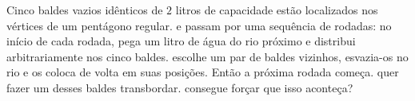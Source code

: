 Cinco baldes vazios idênticos de $2$ litros de capacidade estão localizados nos vértices de um pentágono regular.
 e  passam por uma sequência de rodadas:
no início de cada rodada,  pega um litro de água do rio próximo e distribui arbitrariamente nos cinco baldes.
 escolhe um par de baldes vizinhos, esvazia-os no rio e os coloca de volta em suas posições.
Então a próxima rodada começa.
 quer fazer um desses baldes transbordar.  consegue forçar que isso aconteça?
